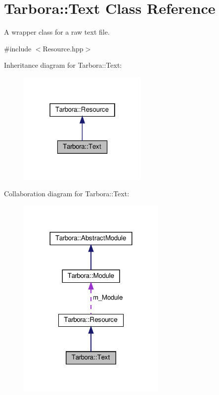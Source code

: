 \hypertarget{classTarbora_1_1Text}{}\section{Tarbora\+:\+:Text Class Reference}
\label{classTarbora_1_1Text}


A wrapper class for a raw text file.  




{\ttfamily \#include $<$Resource.\+hpp$>$}



Inheritance diagram for Tarbora\+:\+:Text\+:\nopagebreak
\begin{figure}[H]
\begin{center}
\leavevmode
\includegraphics[width=178pt]{classTarbora_1_1Text__inherit__graph}
\end{center}
\end{figure}


Collaboration diagram for Tarbora\+:\+:Text\+:
\nopagebreak
\begin{figure}[H]
\begin{center}
\leavevmode
\includegraphics[width=204pt]{classTarbora_1_1Text__coll__graph}
\end{center}
\end{figure}
